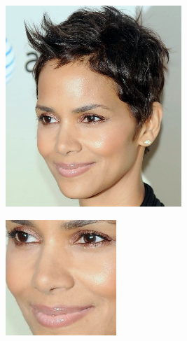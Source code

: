 \begin{figure}[H]
\begin{subfigure}{0.65\textwidth}
\begin{subfigure}{.33\textwidth}
  \centering
  \includegraphics[width=0.95\textwidth]{img/fdResult2/input63.png}
  \caption{}
\end{subfigure}%
\begin{subfigure}{.33\textwidth}
  \centering
  \includegraphics[width=0.6\textwidth]{img/fdResult2/output63.png}
  \caption{}
\end{subfigure}%

\end{subfigure}
\end{figure}
